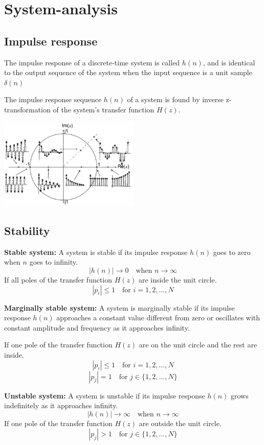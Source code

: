 \section{System-analysis}
\subsection{Impulse response}
The impulse response of a discrete-time system is called $h(n)$, and is identical to the output sequence of the system when the input sequence is a unit sample $\delta(n)$

The impulse response sequence $h(n)$ of a system is found by inverse z-transformation of the system's transfer function $H(z)$.

\begin{center}
  \includegraphics[width=0.5\textwidth]{Images/Impluse-response.png}
\end{center}
\subsection{Stability}
\textbf{Stable system:} A system is stable if its impulse response $h(n)$ goes to zero when $n$ goes to infinity.
$$|h(n)|\to 0 \quad\text{when }n\to \infty$$
If all poles of the transfer function $H(z)$ are inside the unit circle.
$$|p_i|\leq 1\quad\text{for }i=1,2,\dots,N$$

\textbf{Marginally stable system:} A system is marginally stable if its impulse response $h(n)$ approaches a constant value different from zero or oscillates with constant amplitude and frequency as it approaches infinity.

If one pole of the transfer function $H(z)$ are on the unit circle and the rest are inside.
$$|p_i|\leq 1\quad\text{for }i=1,2,\dots,N$$
$$|p_j|= 1\quad\text{for }j\in\{1,2,\dots,N\}$$

\textbf{Unstable system:} A system is unstable if its impulse response $h(n)$ grows indefinitely as it approaches infinity.
$$|h(n)|\to \infty \quad\text{when }n\to \infty$$
If one pole of the transfer function $H(z)$ are outside the unit circle.
$$|p_j|> 1\quad\text{for }j\in\{1,2,\dots,N\}$$

